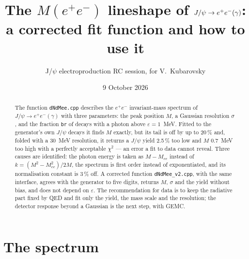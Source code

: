 \documentclass[11pt]{article}
\title{The $M(e^+e^-)$ lineshape of $\Jpsi\to e^+e^-(\gamma)$:\\
a corrected fit function and how to use it}
\author{J/$\psi$ electroproduction RC session, for V.~Kubarovsky}
\date{9 October 2026}
\newcommand{\Mee}{M_{ee}}
\newcommand{\Jpsi}{J/\psi}
\begin{document}
\maketitle

\begin{abstract}
The function \texttt{dNdMee.cpp} describes the $e^+e^-$ invariant-mass spectrum of
$\Jpsi\to e^+e^-(\gamma)$ with three parameters: the peak position $M$, a Gaussian
resolution $\sigma$, and the fraction \texttt{br} of decays with a photon above
$\varepsilon=1$~MeV.  Fitted to the generator's own $\Jpsi$ decays it finds $M$
exactly, but its tail is off by up to 20\,\% and, folded with a 30~MeV resolution,
it returns a $\Jpsi$ yield 2.5\,\% too low and $M$ 0.7~MeV too high with a perfectly
acceptable $\chi^2$ --- an error a fit to data cannot reveal.  Three causes are
identified: the photon energy is taken as $M-\Mee$ instead of
$k=(M^2-\Mee^2)/2M$, the spectrum is first order instead of exponentiated, and its
normalisation constant is 3\,\% off.  A corrected function \texttt{dNdMee\_v2.cpp},
with the same interface, agrees with the generator to five digits, returns $M$,
$\sigma$ and the yield without bias, and does not depend on $\varepsilon$.  The
recommendation for data is to keep the radiative part fixed by QED and fit only the
yield, the mass scale and the resolution; the detector response beyond a Gaussian is
the next step, with GEMC.
\end{abstract}

\section{The spectrum}
\end{document}
